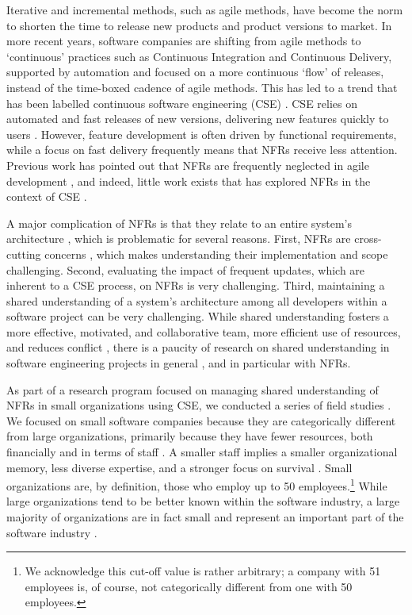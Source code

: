 \documentclass[smallextended]{svjour3}       %
\begin{document}
Iterative and incremental methods, such as agile methods, have become the norm to shorten the time to release new products and product versions to market. In more recent years, software companies are shifting from agile methods to `continuous' practices such as Continuous Integration and Continuous Delivery, supported by automation and focused on a more continuous `flow' of releases, instead of the time-boxed cadence of agile methods. This has led to a trend that has been labelled continuous software engineering (CSE) \citep{fitzgerald2017continuous,bosch2014continuous,klotins2023continuous}.
CSE relies on automated and fast releases of new versions, delivering new features quickly to users \citep{gralha_evolution_2018,klotins2023continuous}. 
However, feature development is often driven by functional requirements, while a focus on fast delivery frequently means that NFRs receive less attention. Previous work has pointed out that NFRs are frequently neglected in agile development \citep{ramesh_agile_2010}, and indeed, little work exists that has explored NFRs in the context of CSE \citep{behutiye_non-functional_2017}.


A major complication of NFRs is that they relate to an entire system's architecture \citep{bass2012software}, which is problematic for several reasons. First, NFRs are cross-cutting concerns \citep{bellomo_evolutionary_2014}, which makes understanding their implementation and scope challenging. Second, evaluating the impact of frequent updates, which are inherent to a CSE process, on NFRs is very challenging. 
Third, maintaining a shared understanding of a system's architecture among all developers within a software project can be very challenging. 
While shared understanding fosters a more effective, motivated, and collaborative team, more efficient use of resources, and reduces conflict \citep{darch_shared_2009}, there is a paucity of research on shared understanding in software engineering projects in general \citep{glinz_shared_2015}, and in particular with NFRs. 


As part of a research program focused on managing shared understanding of NFRs in small organizations using CSE, we conducted a series of field studies \citep{werner2020re,werner_tse_2021,okpara_re2022,okpara_rej2023}. 
We focused on small software companies because they are categorically different from large organizations, primarily because they have fewer resources, both financially and in terms of staff \citep{richardson2007guest}. 
A smaller staff implies a smaller organizational memory, less diverse expertise, and a stronger focus on survival \citep{sanchez2016understanding}.
Small organizations are, by definition, those who employ up to 50 employees.\footnote{We acknowledge this cut-off value is rather arbitrary; a company with 51 employees is, of course, not categorically different from one with 50 employees.} While large organizations tend to be better known within the software industry, a large majority of organizations are in fact small and represent an important part of the software industry \citep{richardson2007guest,sanchez2016understanding}. 
\end{document}

